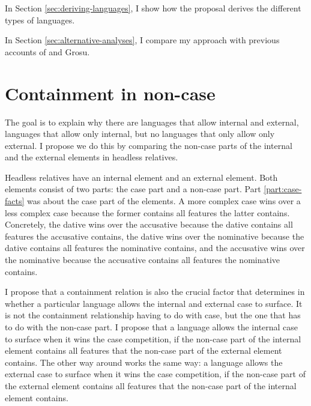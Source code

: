 In Section \ref{sec:deriving-languages}, I show how the proposal derives the different types of languages.

In Section \ref{sec:alternative-analyses}, I compare my approach with previous accounts of \citet{himmelreich2017} and Grosu.

\section{Containment in non-case}\label{sec:containment-noncase}

The goal is to explain why there are languages that allow internal and external, languages that allow only internal, but no languages that only allow only external. I propose we do this by comparing the non-case parts of the internal and the external elements in headless relatives.

Headless relatives have an internal element and an external element. Both elements consist of two parts: the case part and a non-case part. Part \ref{part:case-facts} was about the case part of the elements. A more complex case wins over a less complex case because the former contains all features the latter contains. Concretely, the dative wins over the accusative because the dative contains all features the accusative contains, the dative wins over the nominative because the dative contains all features the nominative contains, and the accusative wins over the nominative because the accusative contains all features the nominative contains.

I propose that a containment relation is also the crucial factor that determines in whether a particular language allows the internal and external case to surface. It is not the containment relationship having to do with case, but the one that has to do with the non-case part. I propose that a language allows the internal case to surface when it wins the case competition, if the non-case part of the internal element contains all features that the non-case part of the external element contains. The other way around works the same way: a language allows the external case to surface when it wins the case competition, if the non-case part of the external element contains all features that the non-case part of the internal element contains.

